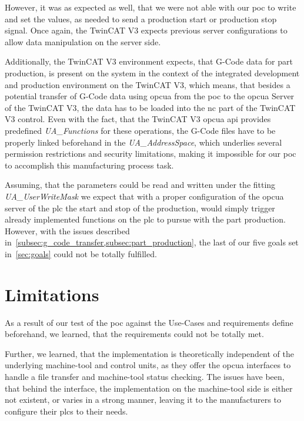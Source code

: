 \documentclass[
a4paper,
twoside,
headsepline,
cleardoublepage=empty,
parskip=half,
draft=false
]{scrbook}
\begin{document}
				However, it was as expected as well, that we were not able with our \gls{poc} to write and set the values, as needed to send a production start or production stop signal. 
				Once again, the TwinCAT V3 expects previous server configurations to allow data manipulation on the server side. 
				
				Additionally, the TwinCAT V3 environment expects, that G-Code data for part production, is present on the system in the context of the integrated development and production environment on the TwinCAT V3, which means, that besides a potential transfer of G-Code data using \gls{opcua} from the \gls{poc} to the \gls{opcua} Server of the TwinCAT V3, the data has to be loaded into 	the \gls{nc} part of the TwinCAT V3 control. 
				Even with the fact, that the TwinCAT V3 \gls{opcua} \gls{api} provides predefined \textit{UA\_Functions} for these operations, the G-Code files have to be properly linked beforehand in the \textit{UA\_AddressSpace}, which underlies several permission restrictions and security limitations, making it impossible for our \gls{poc} to accomplish this manufacturing process task.

				Assuming, that the parameters could be read and written under the fitting \textit{UA\_UserWriteMask} we expect that with a proper configuration of the \gls{opcua} server of the \gls{plc} the start and stop of the production, would simply trigger already implemented functions on the \gls{plc} to pursue with the part production. 
				However, with the issues described in~\cref{subsec:g_code_transfer,subsec:part_production}, the last of our five goals set in~\cref{sec:goals} could not be totally fulfilled.

		\section{Limitations}\label{sec:limitations}

			As a result of our test of the \gls{poc} against the Use-Cases and requirements define beforehand, we learned, that the requirements could not be totally met.
			
			Further, we learned, that the implementation is theoretically independent of the underlying machine-tool and control units, as they offer the \gls{opcua} interfaces to handle a file transfer and machine-tool status checking. The issues have been, that behind the interface, the implementation on the machine-tool side is either not existent, or varies in a strong manner, leaving it to the manufacturers to configure their \gls{plc}s to their needs.
\end{document}
